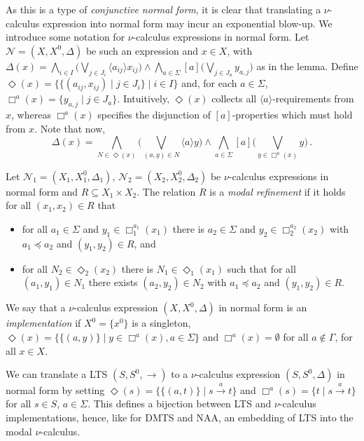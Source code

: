 \documentclass[twocolumn]{svjour3-dummy}
\newcommand*\labpre{\preccurlyeq}
\newcommand*{\must}[1]{\overset{#1}{\longrightarrow}}
\newcommand*{\omust}{\mathord{\must{}}}
\newcommand*\NAA{NAA\xspace}
\newcommand*\cN{\mathcal N}
\newcommand*\bigland{\bigwedge}
\newcommand*\biglor{\bigvee}
\begin{document}
As this is a type of \emph{conjunctive normal form}, it is clear that
translating a $\nu$-calculus expression into normal form may incur an
exponential blow-up.
We introduce some notation for $\nu$-calculus expressions in normal
form.  Let $\cN=( X, X^0, \Delta)$ be such an expression and $x\in X$,
with $\Delta( x)= \bigland_{ i\in I}\big( \biglor_{ j\in J_i} \langle
a_{ ij}\rangle x_{ ij}\big)\land \bigland_{ a\in \Sigma}[ a] \big(
\biglor_{ j\in J_a} y_{ a, j}\big)$ as in the lemma.  Define $\Diamond(
x)=\{\{( a_{ ij}, x_{ ij})\mid j\in J_i\}\mid i\in I\}$ and, for each
$a\in \Sigma$, $\Box^a( x)=\{ y_{ a, j}\mid j\in J_a\}$.  Intuitively,
$\Diamond( x)$ collects all $\langle a\rangle$-requirements from $x$,
whereas $\Box^a( x)$ specifies the disjunction of $[ a]$-properties
which must hold from $x$.  Note that now,
\begin{equation}
  \label{eq:boxdiatodelta}
  \Delta( x)= \bigland_{ N\in
    \Diamond(x)} \Big( \biglor_{( a, y)\in N} \langle a\rangle y\Big)
  \land \bigland_{ a\in \Sigma}[ a]\Big( \biglor_{ y\in \Box^a( x)}
  y\Big)\,.
\end{equation}

Let $\cN_1=( X_1, X^0_1, \Delta_1)$, $\cN_2=( X_2, X^0_2, \Delta_2)$ be
$\nu$-calculus expressions in normal form and $R\subseteq X_1\times
X_2$.  The relation $R$ is a \emph{modal refinement} if it holds for all
$( x_1, x_2)\in R$ that
\begin{itemize}
\item for all $a_1\in \Sigma$ and $y_1\in \Box_1^{ a_1}( x_1)$ there is
  $a_2 \in \Sigma$ and $y_2\in \Box_2^{ a_2}( x_2)$ with $a_1\labpre
  a_2$ and $( y_1, y_2)\in R$, and
\item for all $N_2\in \Diamond_2( x_2)$ there is $N_1\in
  \Diamond_1(x_1)$ such that for all $( a_1, y_1)\in N_1$ there exists
  $( a_2,y_2)\in N_2$ with $a_1 \labpre a_2$ and $( y_1, y_2)\in R$.
\end{itemize}

We say that a $\nu$-calculus expression $( X, X^0, \Delta)$ in normal
form is an \emph{implementation} if $X^0=\{ x^0\}$ is a singleton,
$\Diamond( x)=\{\{( a, y)\}\mid y\in \Box^a( x), a\in \Sigma\}$ and
$\Box^a(x)= \emptyset$ for all $a\notin \Gamma$, for all $x\in X$.  

We can translate a LTS $( S, S^0, \omust)$ to a $\nu$-calculus
expression $( S, S^0, \Delta)$ in normal form by setting $\Diamond(
s)=\{\{( a, t)\}\mid s\must a t\}$ and $\Box^a( s)=\{ t\mid s\must a
t\}$ for all $s\in S$, $a\in \Sigma$.  This defines a bijection
between LTS and $\nu$-calculus implementations, hence, like for DMTS
and \NAA, an embedding of LTS into the modal $\nu$-calculus.
\end{document}
